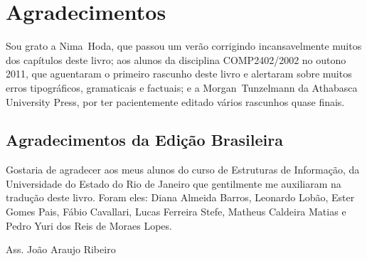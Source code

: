 \chapter*{Agradecimentos}

Sou grato a Nima~Hoda, que passou um verão corrigindo incansavelmente muitos 
dos capítulos deste livro; aos alunos da disciplina COMP2402/2002 no outono 2011, que 
aguentaram o primeiro rascunho deste livro e alertaram sobre muitos erros tipográficos, 
gramaticais e factuais; e a Morgan~Tunzelmann da Athabasca University Press, por ter 
pacientemente editado vários rascunhos quase finais.

\section{Agradecimentos da Edição Brasileira}

Gostaria de agradecer aos meus alunos do curso de Estruturas de Informação, da 
Universidade do Estado do Rio de Janeiro que gentilmente me auxiliaram na tradução
deste livro. Foram eles: Diana Almeida Barros, Leonardo Lobão, Ester Gomes Pais, 
Fábio Cavallari, Lucas Ferreira Stefe, Matheus Caldeira Matias e Pedro Yuri 
dos Reis de Moraes Lopes. 

Ass. João Araujo Ribeiro